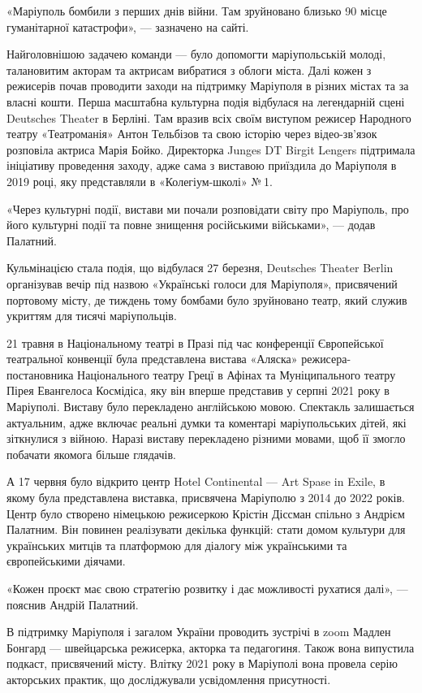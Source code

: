 «Маріуполь бомбили з перших днів війни. Там зруйновано близько 90%
місце гуманітарної катастрофи», — зазначено на сайті.

Найголовнішою задачею команди — було допомогти маріупольській молоді,
талановитим акторам та актрисам вибратися з облоги міста. Далі кожен з
режисерів почав проводити заходи на підтримку Маріуполя в різних містах та за
власні кошти. Перша масштабна культурна подія відбулася на легендарній сцені
Deutsches Theater в Берліні. Там вразив всіх своїм виступом режисер Народного
театру «Театроманія» Антон Тельбізов та свою історію через відео-зв'язок
розповіла актриса Марія Бойко. Директорка Junges DT Birgit Lengers підтримала
ініціативу проведення заходу, адже сама з виставою приїздила до Маріуполя в
2019 році, яку представляли в «Колегіум-школі» № 1.

«Через культурні події, вистави ми почали розповідати світу про Маріуполь, про
його культурні події та повне знищення російськими військами», — додав
Палатний.

Кульмінацією стала подія, що відбулася 27 березня, Deutsches Theater Berlin
організував вечір під назвою «Українські голоси для Маріуполя», присвячений
портовому місту, де тиждень тому бомбами було зруйновано театр, який служив
укриттям для тисячі маріупольців.

21 травня в Національному театрі в Празі під час конференції Європейської
театральної конвенції була представлена вистава «Аляска» режисера-постановника
Національного театру Грецї в Афінах та Муніципального театру Пірея Евангелоса
Космідіса, яку він вперше представив у серпні 2021 року в Маріуполі. Виставу
було перекладено англійською мовою. Спектакль залишається актуальним, адже
включає реальні думки та коментарі маріупольських дітей, які зіткнулися з
війною. Наразі виставу перекладено різними мовами, щоб її змогло побачати
якомога більше глядачів.

А 17 червня було відкрито центр Hotel Continental — Art Spase in Exile, в якому
була представлена виставка, присвячена Маріуполю з 2014 до 2022 років. Центр
було створено німецькою режисеркою Крістін Діссман спільно з Андрієм Палатним.
Він повинен реалізувати декілька функцій: стати домом культури для українських
митців та платформою для діалогу між українськими та європейськими діячами.

«Кожен проєкт має свою стратегію розвитку і дає можливості рухатися далі», — пояснив Андрій Палатний. 

В підтримку Маріуполя і загалом України проводить зустрічі в zoom Мадлен
Бонгард — швейцарська режисерка, акторка та педагогиня. Також вона випустила
подкаст, присвячений місту. Влітку 2021 року в Маріуполі вона провела серію
акторських практик, що досліджували усвідомлення присутності.

